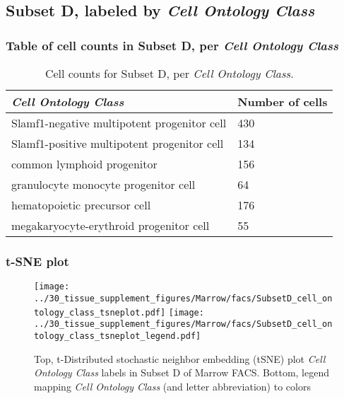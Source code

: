 \clearpage

\subsection{Subset D, labeled by \emph{Cell Ontology Class}}
\subsubsection{Table of cell counts in Subset D, per \emph{Cell Ontology Class}}\begin{table}[h]
\centering
\label{my-label}
\begin{tabular}{@{}ll@{}}
\toprule

\emph{Cell Ontology Class}& Number of cells \\ \midrule
Slamf1-negative multipotent progenitor cell & 430 \\

Slamf1-positive multipotent progenitor cell & 134 \\

common lymphoid progenitor & 156 \\

granulocyte monocyte progenitor cell & 64 \\

hematopoietic precursor cell & 176 \\

megakaryocyte-erythroid progenitor cell & 55 \\
\bottomrule
\end{tabular}
\caption{Cell counts for Subset D, per \emph{Cell Ontology Class}.}
\end{table}

\clearpage
\subsubsection{t-SNE plot}
\begin{figure}[h]
\centering
\texttt{[image: ../30\_tissue\_supplement\_figures/Marrow/facs/SubsetD\_cell\_ontology\_class\_tsneplot.pdf]}
\texttt{[image: ../30\_tissue\_supplement\_figures/Marrow/facs/SubsetD\_cell\_ontology\_class\_tsneplot\_legend.pdf]}
\caption{Top, t-Distributed stochastic neighbor embedding (tSNE) plot  \emph{Cell Ontology Class} labels in Subset D of Marrow FACS. Bottom, legend mapping \emph{Cell Ontology Class} (and letter abbreviation) to colors}
\end{figure}


\clearpage

